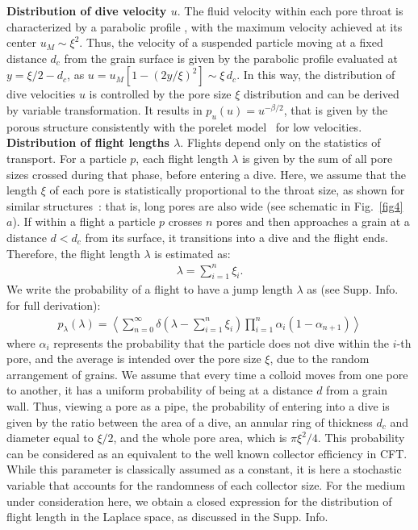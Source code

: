 \documentclass[singlecolumn,pre,notitlepage,preprintnumbers,floatfix,superscriptaddress]{revtex4-1}
\begin{document}
\noindent
\textbf{Distribution of dive velocity $u$}.
The fluid velocity within each pore throat is characterized by a parabolic profile \cite{deAnnaPRF2017,DentzJFM2018}, with the maximum velocity achieved at its center $u_M \sim \xi^2$. Thus, the velocity of a suspended particle moving at a fixed distance $d_c$ from the grain surface is given by the parabolic profile evaluated at $y = \xi/2 - d_c$, as $u = u_M[1 - (2 y/ \xi)^2] \sim \xi \, d_c$. In this way, the distribution of dive velocities $u$ is controlled by the pore size $\xi$ distribution and can be derived by variable transformation. It results in $p_u(u) = u^{-\beta/2}$, that is given by the porous structure consistently with the porelet model~\cite{deAnnaPRF} for low velocities.\\

\noindent
\textbf{Distribution of flight lengths $\lambda$}. Flights depend only on the statistics of transport. For a particle $p$, each flight length $\lambda$ is given by the sum of all pore sizes crossed during that phase, before entering a dive. Here, we assume that the length $\xi$ of each pore is statistically proportional to the throat size, as shown for similar structures~\cite{deAnnaPRF2017,jiao_PRF2024}: that is, long pores are also wide (see schematic in Fig.~\ref{fig4}~$a$). If within a flight a particle $p$ crosses $n$ pores and then approaches a grain at a distance $d < d_c$ from its surface, it transitions into a dive and the flight ends. Therefore, the flight length $\lambda$ is estimated as:
%
\begin{align}\label{eq:ell}
	\lambda = \sum\limits_{i = 1}^{n} \xi_i. 
\end{align}
%
We write the probability of a flight to have a jump length $\lambda$ as (see Supp. Info. for full derivation):
%
\begin{align}\label{lambdaeq}
	p_\lambda(\lambda) = \left\langle \sum\limits_{n = 0}^\infty \delta \left(\lambda - \sum\limits_{i = 1}^{n} \xi_i\right) \prod\limits_{i = 1}^n \alpha_i (1 - \alpha_{n+1}) \right\rangle
\end{align}
%
where $\alpha_i$ represents the probability that the particle does not dive within the $i$-th pore, and the average is intended over the pore size $\xi$, due to the random arrangement of grains. We assume that every time a colloid moves from one pore to another, it has a uniform probability of being at a distance $d$ from a grain wall. Thus, viewing a pore as a pipe, the probability of entering into a dive is given by the ratio between the area of a dive, an annular ring of thickness $d_c$ and diameter equal to $\xi / 2$, and the whole pore area, which is $\pi \xi^2 / 4$. This probability can be considered as an equivalent to the well known collector efficiency in CFT. While this parameter is classically assumed as a constant, it is here a stochastic variable that accounts for the randomness of each collector size. For the medium under consideration here, we obtain a closed expression for the distribution of flight length in the Laplace space, as discussed in the Supp. Info. \\
\end{document}
